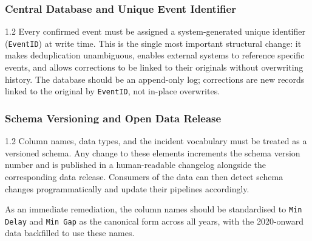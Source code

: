 \documentclass[11pt]{article}
\begin{document}
\subsubsection{Central Database and Unique Event Identifier}
\vspace{-0.25em}
\begin{spacing}{1.2}
Every confirmed event must be assigned a system-generated unique identifier (\texttt{EventID}) at
write time. This is the single most important structural change: it makes deduplication
unambiguous, enables external systems to reference specific events, and allows corrections to be
linked to their originals without overwriting history. The database should be an append-only log;
corrections are new records linked to the original by \texttt{EventID}, not in-place overwrites.
\end{spacing}
\vspace{-0.25em}
\subsubsection{Schema Versioning and Open Data Release}
\vspace{-0.25em}
\begin{spacing}{1.2}
Column names, data types, and the incident vocabulary must be treated as a versioned schema.
Any change to these elements increments the schema version number and is published in a
human-readable changelog alongside the corresponding data release. Consumers of the data can
then detect schema changes programmatically and update their pipelines accordingly.
\vspace{0.75em}

As an immediate remediation, the column names should be standardised to \texttt{Min Delay} and
\texttt{Min Gap} as the canonical form across all years, with the 2020-onward data backfilled to use
these names.
\end{spacing}
\vspace{-0.25em}
\end{document}
